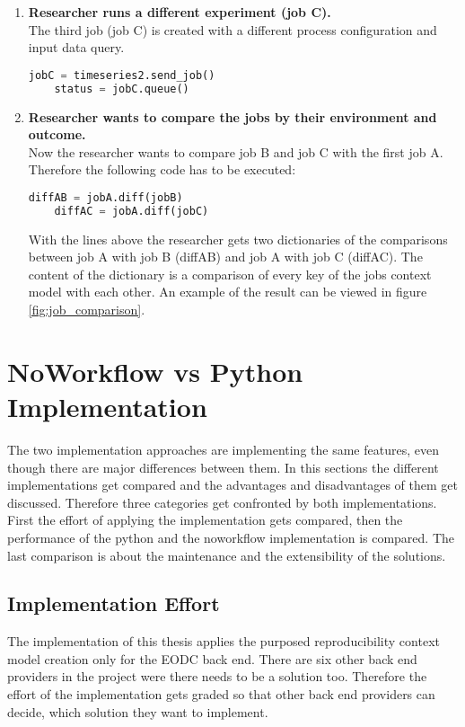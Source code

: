 \documentclass[draft,final]{vutinfth} %
\begin{document}
\begin{enumerate}
	\item \textbf{Researcher runs a different experiment (job C).}\\
	The third job (job C) is created with a different process configuration and input data query.
	\begin{lstlisting}[frame=single, language=Python]
	jobC = timeseries2.send_job()
	status = jobC.queue()
	\end{lstlisting}   
	\item \textbf{Researcher wants to compare the jobs by their environment and outcome.}\\
	Now the researcher wants to compare job B and job C with the first job A. Therefore the following code has to be executed:
	\begin{lstlisting}[frame=single, language=Python]
	diffAB = jobA.diff(jobB)
	diffAC = jobA.diff(jobC)
	\end{lstlisting}  
	With the lines above the researcher gets two dictionaries of the comparisons between job A with job B (diffAB) and job A with job C (diffAC). The content of the dictionary is a comparison of every key of the jobs context model with each other. An example of the result can be viewed in figure \ref{fig:job_comparison}.   
\end{enumerate}


\section{NoWorkflow vs Python Implementation}\label{Evaluation:NvsP}
The two implementation approaches are implementing the same features, even though there are major differences between them. In this sections the different implementations get compared and the advantages and disadvantages of them get discussed. Therefore three categories get confronted by both implementations. First the effort of applying the implementation gets compared, then the performance of the python and the noworkflow implementation is compared. The last comparison is about the maintenance and the extensibility of the solutions. 

\subsection{Implementation Effort}\label{NvsP:Implementation Effort}
The implementation of this thesis applies the purposed reproducibility context model creation only for the EODC back end. There are six other back end providers in the project were there needs to be a solution too. Therefore the effort of the implementation gets graded so that other back end providers can decide, which solution they want to implement.
\end{document}
